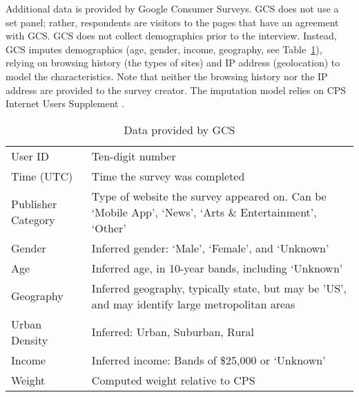 Additional data is provided by Google Consumer Surveys. GCS does not use a set panel; rather, respondents are visitors to the pages that have an agreement with GCS. GCS does not collect demographics prior to the interview. Instead, GCS imputes demographics  (age, gender, income, geography, see Table~\ref{tab:data}), relying on browsing history (the types of sites) and IP address (geolocation) to model the characteristics. Note that neither the browsing history nor the IP address are provided to the survey creator. The imputation model relies on CPS Internet Users Supplement \citep{varianGoogle2015}.

\begin{table}
	\caption{\label{tab:data}Data provided by GCS}
\begin{tabular}{lp{4in}}
\hline
User ID	& Ten-digit number \\
Time (UTC) & Time the survey was completed\\
Publisher Category& Type of website the survey appeared on. Can be `Mobile App', `News', `Arts \& Entertainment', `Other'\\
Gender & Inferred gender: `Male', `Female', and `Unknown'\\
Age	& Inferred age, in 10-year bands, including `Unknown'\\
Geography	& Inferred geography, typically state, but may be 'US', and may identify large metropolitan areas\\
Urban Density& Inferred: Urban, Suburban, Rural\\
Income & Inferred income: Bands of \$25,000 or `Unknown'\\
Weight & Computed weight relative to CPS\\
\hline
\end{tabular}
\end{table}
